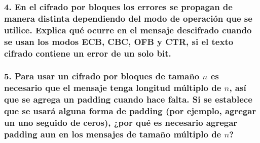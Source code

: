 \documentclass[12pt]{article}
\begin{document}
\subsubsection*{4. En el cifrado por bloques los errores se propagan de manera distinta dependiendo del modo de operación que se utilice. Explica qué ocurre en el mensaje descifrado cuando se usan los modos ECB, CBC, OFB y CTR, si el texto cifrado
contiene un error de un solo bit.}
\subsubsection*{5. Para usar un cifrado por bloques de tamaño $n$ es necesario que el mensaje tenga longitud múltiplo de $n$, así que se agrega un padding cuando hace falta. Si se establece que se usará alguna forma de padding (por ejemplo, agregar un uno seguido de ceros), ¿por qué es necesario agregar padding aun en los mensajes de tamaño múltiplo de $n$?}
\end{document}
